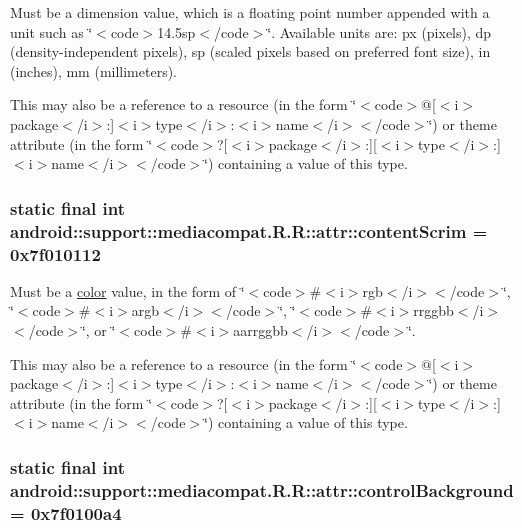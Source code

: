 Must be a dimension value, which is a floating point number appended with a unit such as \char`\"{}$<$code$>$14.5sp$<$/code$>$\char`\"{}. Available units are: px (pixels), dp (density-independent pixels), sp (scaled pixels based on preferred font size), in (inches), mm (millimeters). 

This may also be a reference to a resource (in the form \char`\"{}$<$code$>$@\mbox{[}$<$i$>$package$<$/i$>$:\mbox{]}$<$i$>$type$<$/i$>$:$<$i$>$name$<$/i$>$$<$/code$>$\char`\"{}) or theme attribute (in the form \char`\"{}$<$code$>$?\mbox{[}$<$i$>$package$<$/i$>$:\mbox{]}\mbox{[}$<$i$>$type$<$/i$>$:\mbox{]}$<$i$>$name$<$/i$>$$<$/code$>$\char`\"{}) containing a value of this type. \hypertarget{classandroid_1_1support_1_1mediacompat_1_1_r_1_1attr_9fb934987aa3cac98e57c45e3cf6eeeb}{
\subsubsection[{contentScrim}]{\setlength{\rightskip}{0pt plus 5cm}static final int android::support::mediacompat.R.R::attr::contentScrim = 0x7f010112}}
\label{classandroid_1_1support_1_1mediacompat_1_1_r_1_1attr_9fb934987aa3cac98e57c45e3cf6eeeb}


Must be a \hyperlink{classandroid_1_1support_1_1mediacompat_1_1_r_1_1color}{color} value, in the form of \char`\"{}$<$code$>$\#$<$i$>$rgb$<$/i$>$$<$/code$>$\char`\"{}, \char`\"{}$<$code$>$\#$<$i$>$argb$<$/i$>$$<$/code$>$\char`\"{}, \char`\"{}$<$code$>$\#$<$i$>$rrggbb$<$/i$>$$<$/code$>$\char`\"{}, or \char`\"{}$<$code$>$\#$<$i$>$aarrggbb$<$/i$>$$<$/code$>$\char`\"{}. 

This may also be a reference to a resource (in the form \char`\"{}$<$code$>$@\mbox{[}$<$i$>$package$<$/i$>$:\mbox{]}$<$i$>$type$<$/i$>$:$<$i$>$name$<$/i$>$$<$/code$>$\char`\"{}) or theme attribute (in the form \char`\"{}$<$code$>$?\mbox{[}$<$i$>$package$<$/i$>$:\mbox{]}\mbox{[}$<$i$>$type$<$/i$>$:\mbox{]}$<$i$>$name$<$/i$>$$<$/code$>$\char`\"{}) containing a value of this type. \hypertarget{classandroid_1_1support_1_1mediacompat_1_1_r_1_1attr_14425b2c6c7ececcac7d52d4fee4a28e}{
\subsubsection[{controlBackground}]{\setlength{\rightskip}{0pt plus 5cm}static final int android::support::mediacompat.R.R::attr::controlBackground = 0x7f0100a4}}
\label{classandroid_1_1support_1_1mediacompat_1_1_r_1_1attr_14425b2c6c7ececcac7d52d4fee4a28e}


